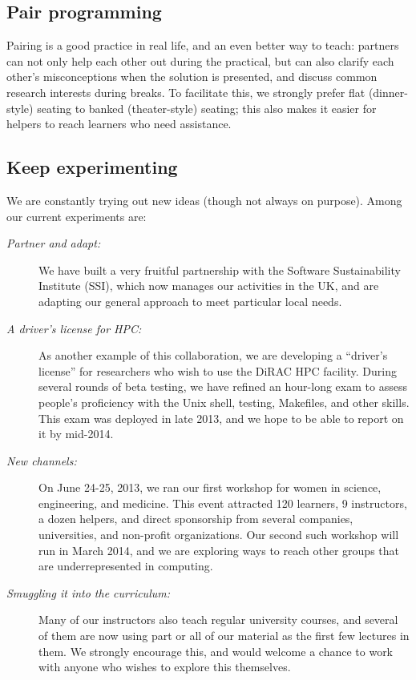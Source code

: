 \documentclass[10pt,a4paper,twocolumn]{article}
\begin{document}
\subsection*{Pair programming}

Pairing is a good practice in real life, and an even better way to
teach: partners can not only help each other out during the practical,
but can also clarify each other's misconceptions when the solution is
presented, and discuss common research interests during breaks. To
facilitate this, we strongly prefer flat (dinner-style) seating to
banked (theater-style) seating; this also makes it easier for helpers
to reach learners who need assistance.

\subsection*{Keep experimenting}

We are constantly trying out new ideas (though not always on purpose).
Among our current experiments are:

\begin{description}

\item[\emph{Partner and adapt:}] We have built a very fruitful
  partnership with the Software Sustainability Institute (SSI), which
  now manages our activities in the UK, and are adapting our general
  approach to meet particular local needs.

\item[\emph{A driver's license for HPC:}] As another example of this
  collaboration, we are developing a ``driver's license'' for
  researchers who wish to use the DiRAC HPC facility. During several
  rounds of beta testing, we have refined an hour-long exam to assess
  people's proficiency with the Unix shell, testing, Makefiles, and
  other skills. This exam was deployed in late 2013, and we hope to be
  able to report on it by mid-2014.

\item[\emph{New channels:}] On June 24-25, 2013, we ran our first
  workshop for women in science, engineering, and medicine. This event
  attracted 120 learners, 9 instructors, a dozen helpers, and direct
  sponsorship from several companies, universities, and non-profit
  organizations. Our second such workshop will run in March 2014, and
  we are exploring ways to reach other groups that are
  underrepresented in computing.

\item[\emph{Smuggling it into the curriculum:}] Many of our instructors
  also teach regular university courses, and several of them are now
  using part or all of our material as the first few lectures in
  them. We strongly encourage this, and would welcome a chance to work
  with anyone who wishes to explore this themselves.

\end{description}
\end{document}

